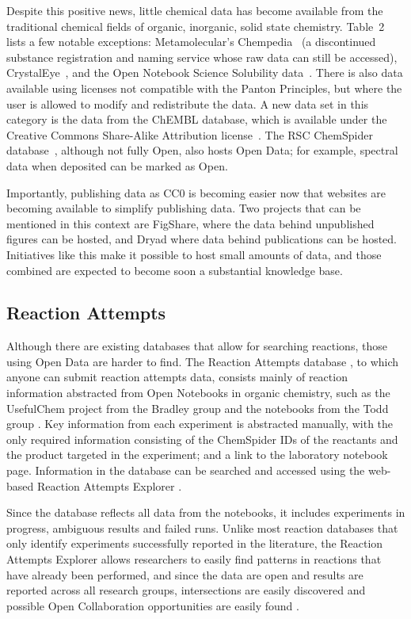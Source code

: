 \documentclass[10pt]{bmc_article}
\newenvironment{bmcformat}{\begin{raggedright}\baselineskip20pt\sloppy\setboolean{publ}{false}}{\end{raggedright}\baselineskip20pt\sloppy}
\begin{document}
\begin{bmcformat}
Despite this positive news, little chemical data has become
available from the traditional chemical fields of organic,
inorganic, solid state chemistry. Table~2 lists a few notable
exceptions: Metamolecular's Chempedia~\cite{Chempedia} (a discontinued substance registration
and naming service whose raw data can still be accessed),
CrystalEye~\cite{WebCrystalEye},
and the Open Notebook Science Solubility
data~\cite{ONS2010}. There is also data available using licenses
not compatible with the Panton Principles, but where the user
is allowed to modify and redistribute the data. A new data
set in this category is the data from the ChEMBL database,
which is available under the Creative Commons Share-Alike
Attribution license~\cite{Overington2009}. The RSC ChemSpider database~\cite{chemspider}, although
not fully Open, also hosts Open Data; for example, spectral data when deposited
can be marked as Open.

Importantly, publishing data as CC0 is becoming easier now that
websites are becoming available to simplify publishing data. Two
projects that can be mentioned in this context are
FigShare\cite{WebFigShare}, where the data behind unpublished figures
can be hosted, and Dryad\cite{WebDryad} where data behind publications
can be hosted. Initiatives like this make it possible to host small
amounts of data, and those combined are expected to become soon a
substantial knowledge base.

\subsection*{Reaction Attempts}
Although there are existing databases that allow for searching reactions, those
using Open Data are harder to find. The Reaction Attempts database
\cite{ReactionAttempts}, to which anyone can
submit reaction attempts data, consists mainly of reaction information
abstracted from Open Notebooks in organic chemistry, such as the
UsefulChem project from the Bradley group
\cite{UsefulChemReactionAttempts}
and the notebooks from the Todd group \cite{UsefulChemTodd}.
Key information from each experiment is abstracted manually, with the
only required information consisting of the ChemSpider IDs of the
reactants and the product targeted in the experiment; and a link to
the laboratory notebook page. Information in the database can be
searched and accessed using the web-based Reaction Attempts Explorer
\cite{ReactionAttemptsExplorer}.

Since the database reflects all data
from the notebooks, it includes experiments in progress, ambiguous results and
failed runs. Unlike most reaction databases that only identify
experiments successfully reported in the literature, 
the Reaction
Attempts Explorer allows researchers to easily find patterns in
reactions that have already been performed, 
and since the data are open
and results are reported across all research groups, intersections are
easily discovered and possible Open Collaboration opportunities are
easily found \cite{UsefulChemSocialNetworks, ekins_collaboration_2011}.


\end{bmcformat}
\end{document}
